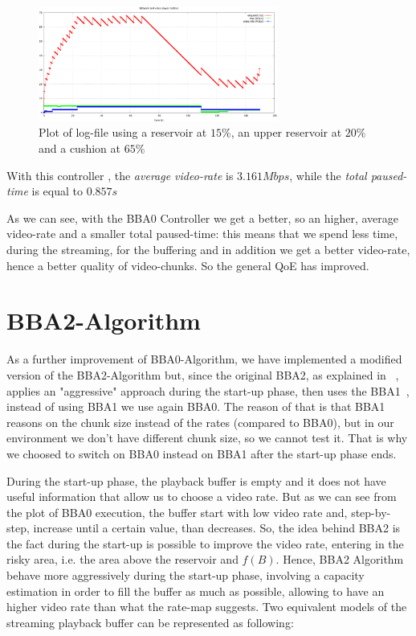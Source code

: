 \documentclass[a4paper]{report}
\begin{document}
\begin{figure}[H]
  \begin{center}
    \includegraphics[width=0.7\textwidth]{res_fifteen_cushion_sixtyfive}
  \end{center}
  \caption{Plot of log-file using a reservoir at $15\%$, an upper reservoir at $20\%$ and a cushion at $65\%$}
   \label{fig:bba02}
\end{figure}

With this controller , the \textit{average video-rate} is $3.161 Mbps$, while the \textit{total paused-time} is equal to $0.857 s$

As we can see, with the BBA0 Controller we get a better, so an higher, average video-rate  and a smaller total paused-time: this means that we spend less time, during the streaming, for the buffering and in addition we get a better video-rate, hence a better quality of video-chunks. So the general QoE has improved.

\section{BBA2-Algorithm}
As a further improvement of BBA0-Algorithm, we have implemented a modified version of the BBA2-Algorithm but, since the original BBA2, as explained in ~\cite{Huang:2014:BAR:2740070.2626296}, applies an "aggressive" approach during the start-up phase, then uses the BBA1~\cite{Huang:2014:BAR:2740070.2626296}, instead of using BBA1  we use again BBA0. The reason of that is that BBA1 reasons on the chunk size instead of the rates (compared to BBA0), but in our environment we don't have different chunk size, so we cannot test it. That is why we choosed to switch on BBA0 instead on BBA1 after the start-up phase ends.

During the start-up phase, the playback buffer is empty and it does not have useful information that allow us to choose a video rate. But as we can see from the plot of BBA0 execution, the buffer start with low video rate and, step-by-step, increase until a certain value, than decreases. So, the idea behind BBA2 is the fact during the start-up is possible to improve the video rate, entering in the risky area, i.e. the area above the reservoir and $f(B)$. Hence, BBA2 Algorithm behave more aggressively during the start-up phase, involving a capacity estimation in order to fill the buffer as much as possible, allowing to have an higher video rate than what the rate-map suggests.
Two equivalent models of the streaming playback buffer can be represented as following:
\end{document}
